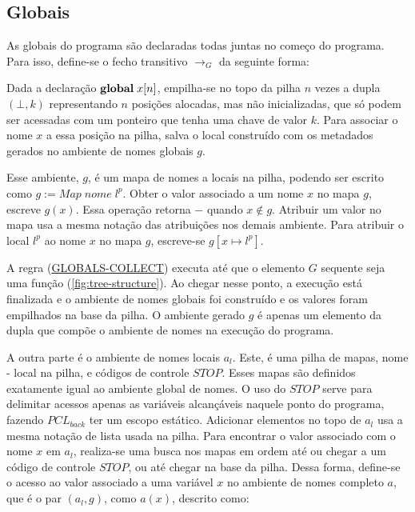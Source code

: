 \subsection{Globais}
\label{sec:pcl-back:semantica:globals}

As globais do programa são declaradas todas juntas no começo do programa. Para isso, define-se o fecho transitivo $\to_G$ da seguinte forma:


\noindent Dada a declaração $\mathbf{global}\;x[n]$, empilha-se no topo da pilha $n$ vezes a dupla $(\bot, k)$ representando $n$ posições alocadas, mas não inicializadas, que só podem ser acessadas com um ponteiro que tenha uma chave de valor $k$. Para associar o nome $x$ a essa posição na pilha, salva o local construído com os metadados gerados no ambiente de nomes globais $g$.

Esse ambiente, $g$, é um mapa de nomes a locais na pilha, podendo ser escrito como $g := Map\;nome\;l^p$. Obter o valor associado a um nome $x$ no mapa $g$, escreve $g(x)$. Essa operação  retorna $-$ quando $x \notin g$. Atribuir um valor no mapa usa a mesma notação das atribuições nos demais ambiente. Para atribuir o local $l^p$ ao nome $x$ no mapa $g$, escreve-se $g[x \mapsto l^p]$. 

A regra (\hyperref[rule:globals-collect]{GLOBALS-COLLECT}) executa até que o elemento $G$ sequente seja uma função (\ref{fig:tree-structure}). Ao chegar nesse ponto, a execução está finalizada e o ambiente de nomes globais foi construído e os valores foram empilhados na base da pilha. O ambiente gerado $g$ é apenas um elemento da dupla que compõe o ambiente de nomes na execução do programa. 

A outra parte é o ambiente de nomes locais $a_l$. Este, é uma pilha de mapas, nome - local na pilha, e códigos de controle $STOP$. Esses mapas são definidos exatamente igual ao ambiente global de nomes. O uso do $STOP$ serve para delimitar acessos apenas as variáveis alcançáveis naquele ponto do programa, fazendo $PCL_{back}$ ter um escopo estático. Adicionar elementos no topo de $a_l$ usa a mesma notação de lista usada na pilha. Para encontrar o valor associado com o nome $x$ em $a_l$, realiza-se uma busca nos mapas em ordem até ou chegar a um código de controle $STOP$, ou até chegar na base da pilha. Dessa forma, define-se o acesso ao valor associado a uma variável $x$ no ambiente de nomes completo $a$, que é o par $(a_l, g)$, como $a(x)$, descrito como:

